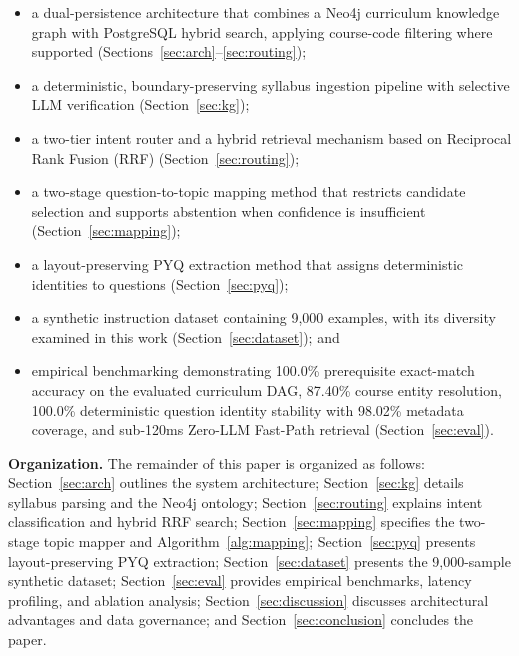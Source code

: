 \documentclass[conference]{IEEEtran}
\begin{document}
\begin{itemize}
\item a dual-persistence architecture that combines a Neo4j curriculum knowledge graph with PostgreSQL hybrid search, applying course-code filtering where supported (Sections~\ref{sec:arch}--\ref{sec:routing});

\item a deterministic, boundary-preserving syllabus ingestion pipeline with selective LLM verification (Section~\ref{sec:kg});

\item a two-tier intent router and a hybrid retrieval mechanism based on Reciprocal Rank Fusion (RRF) (Section~\ref{sec:routing});

\item a two-stage question-to-topic mapping method that restricts candidate selection and supports abstention when confidence is insufficient (Section~\ref{sec:mapping});

\item a layout-preserving PYQ extraction method that assigns deterministic identities to questions (Section~\ref{sec:pyq});

\item a synthetic instruction dataset containing 9,000 examples, with its diversity examined in this work (Section~\ref{sec:dataset}); and

\item empirical benchmarking demonstrating 100.0\% prerequisite exact-match accuracy on the evaluated curriculum DAG, 87.40\% course entity resolution, 100.0\% deterministic question identity stability with 98.02\% metadata coverage, and sub-120ms Zero-LLM Fast-Path retrieval (Section~\ref{sec:eval}).
\end{itemize}

\textbf{Organization.} The remainder of this paper is organized as follows: Section~\ref{sec:arch} outlines the system architecture; Section~\ref{sec:kg} details syllabus parsing and the Neo4j ontology; Section~\ref{sec:routing} explains intent classification and hybrid RRF search; Section~\ref{sec:mapping} specifies the two-stage topic mapper and Algorithm~\ref{alg:mapping}; Section~\ref{sec:pyq} presents layout-preserving PYQ extraction; Section~\ref{sec:dataset} presents the 9,000-sample synthetic dataset; Section~\ref{sec:eval} provides empirical benchmarks, latency profiling, and ablation analysis; Section~\ref{sec:discussion} discusses architectural advantages and data governance; and Section~\ref{sec:conclusion} concludes the paper.
\end{document}

